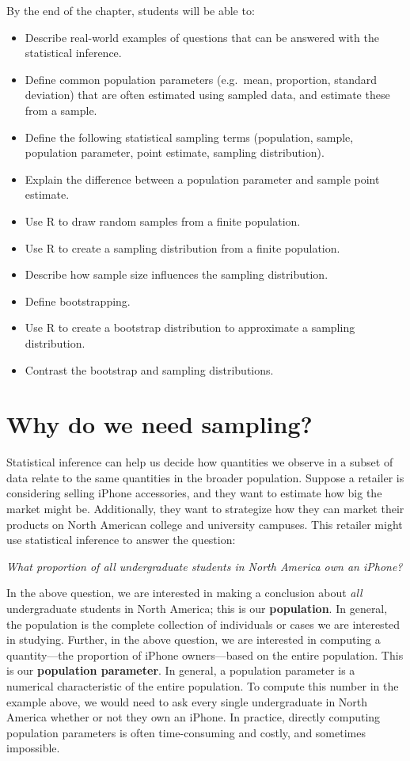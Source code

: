 \documentclass[
]{krantz}
\providecommand{\tightlist}{%
  \setlength{\itemsep}{0pt}\setlength{\parskip}{0pt}}
\begin{document}
By the end of the chapter, students will be able to:

\begin{itemize}
\tightlist
\item
  Describe real-world examples of questions that can be answered with the statistical inference.
\item
  Define common population parameters (e.g.~mean, proportion, standard deviation) that are often estimated using sampled data, and estimate these from a sample.
\item
  Define the following statistical sampling terms (population, sample, population parameter, point estimate, sampling distribution).
\item
  Explain the difference between a population parameter and sample point estimate.
\item
  Use R to draw random samples from a finite population.
\item
  Use R to create a sampling distribution from a finite population.
\item
  Describe how sample size influences the sampling distribution.
\item
  Define bootstrapping.
\item
  Use R to create a bootstrap distribution to approximate a sampling distribution.
\item
  Contrast the bootstrap and sampling distributions.
\end{itemize}

\hypertarget{why-do-we-need-sampling}{%
\section{Why do we need sampling?}\label{why-do-we-need-sampling}}

Statistical inference can help us decide how quantities we observe in
a subset of data relate to the same quantities in the broader
population. Suppose a retailer is considering selling iPhone accessories, and they want to estimate how big the market might be. Additionally, they want to strategize how they can market their products on North American college and university campuses. This retailer might use statistical inference to answer the question:

\emph{What proportion of all undergraduate students in North America own an iPhone?}

In the above question, we are interested in making a conclusion about \emph{all}
undergraduate students in North America; this is our \textbf{population}.
In general, the population is the complete collection of individuals or cases we are interested in studying.
Further, in the above question, we are interested in computing a quantity---the proportion
of iPhone owners---based on the entire population. This is our \textbf{population parameter}.
In general, a population parameter is a numerical characteristic
of the entire population. To compute this number in the example above, we would need to ask
every single undergraduate in North America whether or not they own an iPhone. In practice,
directly computing population parameters is often time-consuming and costly, and sometimes impossible.
\end{document}
